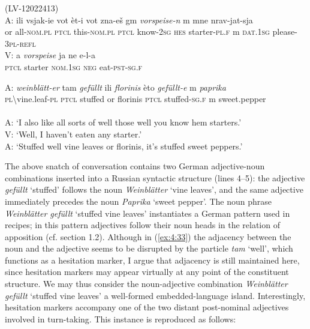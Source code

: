 \ea
\label{ex:4:33}
(LV-12022413)\\
 \gll A: ili vsjak-ie vot èt-i vot zna-eš gm  \textit{vorspeise-n} {{\textcolor[rgb]{1,1,1} {m}} mne} nrav-jat-sja\\
	{} or all-\textsc{nom.pl} \textsc{ptcl} this-\textsc{nom.pl} \textsc{ptcl} know-\textsc{2sg} \textsc{hes} starter-\textsc{pl.f}  {{\textcolor[rgb]{1,1,1} {m}} \textsc{dat.1sg}} please-\textsc{3pl-refl}\\
\glt
 \gll V: a \textit{vorspeise}  ja ne e-l-a \\
	{} \textsc{ptcl} starter \textsc{nom.1sg} \textsc{neg} eat-\textsc{pst-sg.f} \\
	\glt
	
 \gll A: \textit{weinblätt-er}  tam \textit{gefüllt}  ili \textit{florinis} èto \textit{gefüllt-e} {{\textcolor[rgb]{1,1,1} {m}} \textit{paprika}} \\
	{}  \textsc{pl}\textbackslash{}vine.leaf-\textsc{pl} \textsc{ptcl} stuffed or florinis \textsc{ptcl} stuffed-\textsc{sg.f}  {{\textcolor[rgb]{1,1,1} {m}} sweet.pepper}\\
\glt \hfill \\

A: `I also like all sorts of well those well you know hem starters.'\\
V: `Well, I haven't eaten any starter.'\\
A: `Stuffed well vine leaves or florinis, it's stuffed sweet peppers.'
\z

\noindent The above snatch of conversation contains two German adjective-noun combinations inserted into a Russian syntactic structure (lines 4--5): the adjective \textit{gefüllt} `stuffed' follows the noun \textit{Weinblätter} `vine leaves', and the same adjective immediately precedes the noun \textit{Paprika} `sweet pepper'. The noun phrase \textit{Weinblätter gefüllt} `stuffed vine leaves' instantiates a German pattern used in recipes; in this pattern adjectives follow their noun heads in the relation of apposition (cf. section 1.2). Although in (\ref{ex:4:33}) the adjacency between the noun and the adjective seems to be disrupted by the particle \textit{tam} `well', which functions as a hesitation marker, I argue that adjacency is still maintained here, since hesitation markers may appear virtually at any point of the constituent structure. We may thus consider the noun-adjective combination \textit{Weinblätter gefüllt} `stuffed vine leaves' a well-formed embedded-language island. Interestingly, hesitation markers accompany one of the two distant post-nominal adjectives involved in turn-taking. This instance is reproduced as follows:

